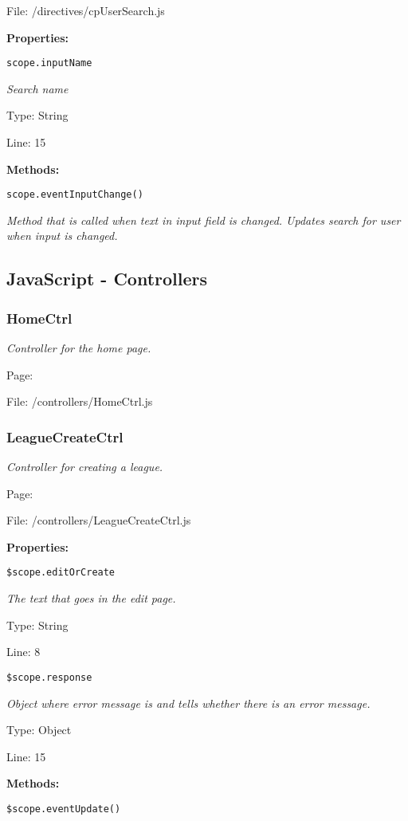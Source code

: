 File: /directives/cpUserSearch.js

\textbf{Properties:}

\texttt{scope.inputName}

{\scriptsize
\textit{Search name}

Type: String

Line: 15

}
\textbf{Methods:}

\texttt{scope.eventInputChange()}

{\scriptsize
\textit{Method that is called when text in input field is changed.
Updates search for user when input is changed.}

}

\subsection{JavaScript - Controllers}
\subsubsection{HomeCtrl}\label{HomeCtrl.js.doc}
\textit{Controller for the home page.}

Page: \pageref{HomeCtrl.js}

File: /controllers/HomeCtrl.js

\subsubsection{LeagueCreateCtrl}\label{LeagueCreateCtrl.js.doc}
\textit{Controller for creating a league.}

Page: \pageref{LeagueCreateCtrl.js}

File: /controllers/LeagueCreateCtrl.js

\textbf{Properties:}

\texttt{\$scope.editOrCreate}

{\scriptsize
\textit{The text that goes in the edit page.}

Type: String

Line: 8

}
\texttt{\$scope.response}

{\scriptsize
\textit{Object where error message is and tells whether there is an error message.}

Type: Object

Line: 15

}
\textbf{Methods:}

\texttt{\$scope.eventUpdate()}

